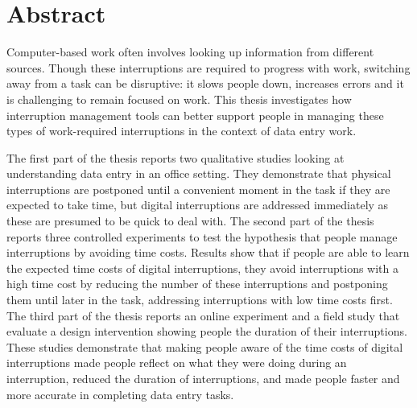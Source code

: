 \section*{Abstract}
Computer-based work often involves looking up information from different sources. Though these interruptions are required to progress with work, switching away from a task can be disruptive: it slows people down, increases errors and it is challenging to remain focused on work. This thesis investigates how interruption management tools can better support people in managing these types of work-required interruptions in the context of data entry work.

The first part of the thesis reports two qualitative studies looking at understanding data entry in an office setting. They demonstrate that physical interruptions are postponed until a convenient moment in the task if they are expected to take time, but digital interruptions are addressed immediately as these are presumed to be quick to deal with. The second part of the thesis reports three controlled experiments to test the hypothesis that people manage interruptions by avoiding time costs. Results show that if people are able to learn the expected time costs of digital interruptions, they avoid interruptions with a high time cost by reducing the number of these interruptions and postponing them until later in the task, addressing interruptions with low time costs first. The third part of the thesis reports an online experiment and a field study that evaluate a design intervention showing people the duration of their interruptions. These studies demonstrate that making people aware of the time costs of digital interruptions made people reflect on what they were doing during an interruption, reduced the duration of interruptions, and made people faster and more accurate in completing data entry tasks.

